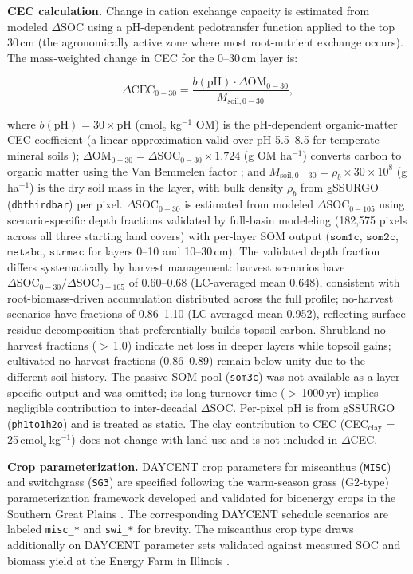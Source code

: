 \documentclass[11pt]{article}
\begin{document}
\textbf{CEC calculation.}
Change in cation exchange capacity is estimated from modeled $\Delta$SOC using a pH-dependent pedotransfer function applied to the top 30\,cm (the agronomically active zone where most root-nutrient exchange occurs). The mass-weighted change in CEC for the 0--30\,cm layer is:

\[
\Delta \mathrm{CEC}_{0-30}
= \frac{b(\mathrm{pH}) \cdot \Delta \mathrm{OM}_{0-30}}{M_{\mathrm{soil},0-30}},
\]

\noindent where $b(\mathrm{pH}) = 30 \times \mathrm{pH}$ (cmol$_\text{c}$ kg$^{-1}$ OM) is the pH-dependent organic-matter CEC coefficient (a linear approximation valid over pH 5.5--8.5 for temperate mineral soils \citep{BradyWeilSoilsPlaceholder}); $\Delta \mathrm{OM}_{0-30} = \Delta\mathrm{SOC}_{0-30} \times 1.724$ (g OM ha$^{-1}$) converts carbon to organic matter using the Van Bemmelen factor \citep{BradyWeilSoilsPlaceholder}
; and $M_{\mathrm{soil},0-30} = \rho_b \times 30 \times 10^{8}$ (g ha$^{-1}$) is the dry soil mass in the layer, with bulk density $\rho_b$ from gSSURGO (\texttt{dbthirdbar}) per pixel. $\Delta\mathrm{SOC}_{0-30}$ is estimated from modeled $\Delta\mathrm{SOC}_{0-105}$ using scenario-specific depth fractions validated by full-basin modeleling (182,575 pixels across all three starting land covers) with per-layer SOM output ($\texttt{som1c}$, $\texttt{som2c}$, $\texttt{metabc}$, $\texttt{strmac}$ for layers 0--10 and 10--30\,cm). The validated depth fraction differs systematically by harvest management: harvest scenarios have $\Delta\mathrm{SOC}_{0-30} / \Delta\mathrm{SOC}_{0-105}$ of 0.60--0.68 (LC-averaged mean 0.648), consistent with root-biomass-driven accumulation distributed across the full profile; no-harvest scenarios have fractions of 0.86--1.10 (LC-averaged mean 0.952), reflecting surface residue decomposition that preferentially builds topsoil carbon. Shrubland no-harvest fractions ($>$\,1.0) indicate net loss in deeper layers while topsoil gains; cultivated no-harvest fractions (0.86--0.89) remain below unity due to the different soil history. The passive SOM pool (\texttt{som3c}) was not available as a layer-specific output and was omitted; its long turnover time ($>$\,1000\,yr) implies negligible contribution to inter-decadal $\Delta\mathrm{SOC}$. Per-pixel pH is from gSSURGO (\texttt{ph1to1h2o}) and is treated as static. The clay contribution to CEC (CEC$_\text{clay}$ = 25\,cmol$_\text{c}$\,kg$^{-1}$) does not change with land use and is not included in $\Delta$CEC.

\textbf{Crop parameterization.}
DAYCENT crop parameters for miscanthus (\texttt{MISC}) and switchgrass (\texttt{SG3}) are specified following the warm-season grass (G2-type) parameterization framework developed and validated for bioenergy crops in the Southern Great Plains \citep{WangDou2017DAYCENT,WangDou2020AgronomyJ}. The corresponding DAYCENT schedule scenarios are labeled \texttt{misc\_*} and \texttt{swi\_*} for brevity. The miscanthus crop type draws additionally on DAYCENT parameter sets validated against measured SOC and biomass yield at the Energy Farm in Illinois \citep{Davis2010Comparative}.
\end{document}
